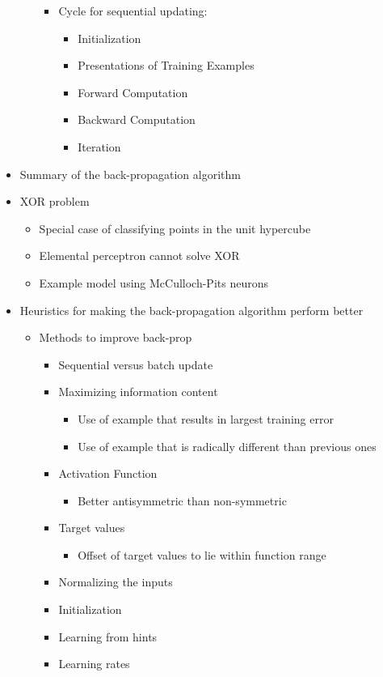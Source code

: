 \documentclass[paper=a4, fontsize=11pt]{scrartcl} %
\numberwithin{equation}{section} %
\numberwithin{figure}{section} %
\numberwithin{table}{section} %
\begin{document}
\begin{itemize}
\begin{itemize}
		\begin{itemize}
			\item Cycle for sequential updating:
			\begin{itemize}
				\item Initialization
				\item Presentations of Training Examples
				\item Forward Computation
				\item Backward Computation
				\item Iteration
			\end{itemize}
		\end{itemize}
	\end{itemize}
	
	\item Summary of the back-propagation algorithm
	
	
	\item XOR problem
	\begin{itemize}
		\item Special case of classifying points in the unit hypercube
		\item Elemental perceptron cannot solve XOR
		\item Example model using McCulloch-Pits neurons
	\end{itemize}
	
	
	\item Heuristics for making the back-propagation algorithm perform better
	\begin{itemize}
		\item Methods to improve back-prop
		\begin{itemize}
			\item Sequential versus batch update
			\item Maximizing information content
			\begin{itemize}
				\item Use of example that results in largest training error
				\item Use of example that is radically different than previous ones
			\end{itemize}
			\item Activation Function
			\begin{itemize}
				\item Better antisymmetric than non-symmetric
			\end{itemize}
			\item Target values
			\begin{itemize}
				\item Offset of target values to lie within function range
			\end{itemize}
			\item Normalizing the inputs
			\item Initialization
			\item Learning from hints
			\item Learning rates
		\end{itemize}
	\end{itemize}
\end{itemize}
\end{document}
